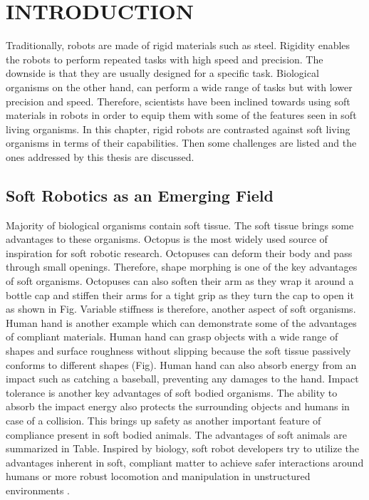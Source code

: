 \chapter{INTRODUCTION}
\label{chap:intro}

Traditionally, robots are made of rigid materials such as steel. Rigidity enables the robots to perform repeated tasks with high speed and precision. The downside is that they are usually designed for a specific task. Biological organisms on the other hand, can perform a wide range of tasks but with lower precision and speed. Therefore, scientists have been inclined towards using soft materials in robots in order to equip them with some of the features seen in soft living organisms. In this chapter, rigid robots are contrasted against soft living organisms in terms of their capabilities. Then some challenges are listed and the ones addressed by this thesis are discussed. 

\section{Soft Robotics as an Emerging Field}
Majority of biological organisms contain soft tissue. The soft tissue brings some advantages to these organisms. Octopus is the most widely used source of inspiration for soft robotic research. Octopuses can deform their body and pass through small openings. Therefore, shape morphing is one of the key advantages of soft organisms. Octopuses can also soften their arm as they wrap it around a bottle cap and stiffen their arms for a tight grip as they turn the cap to open it as shown in Fig. Variable stiffness is therefore, another aspect of soft organisms. Human hand is another example which can demonstrate some of the advantages of compliant materials. Human hand can grasp objects with a wide range of shapes and surface roughness without slipping because the soft tissue passively conforms to different shapes (Fig). Human hand can also absorb energy from an impact such as catching a baseball, preventing any damages to the hand. Impact tolerance is another key advantages of soft bodied organisms. The ability to absorb the impact energy also protects the surrounding objects and humans in case of a collision. This brings up safety as another important feature of compliance present in soft bodied animals. The advantages of soft animals are summarized in Table. Inspired by biology, soft robot developers try to utilize the advantages inherent in soft, compliant matter to achieve safer interactions around humans or more robust locomotion and manipulation in unstructured environments \cite{martinez2013robotic,laschi2012soft,tolley2014resilient,bilodeau2015monolithic}.

